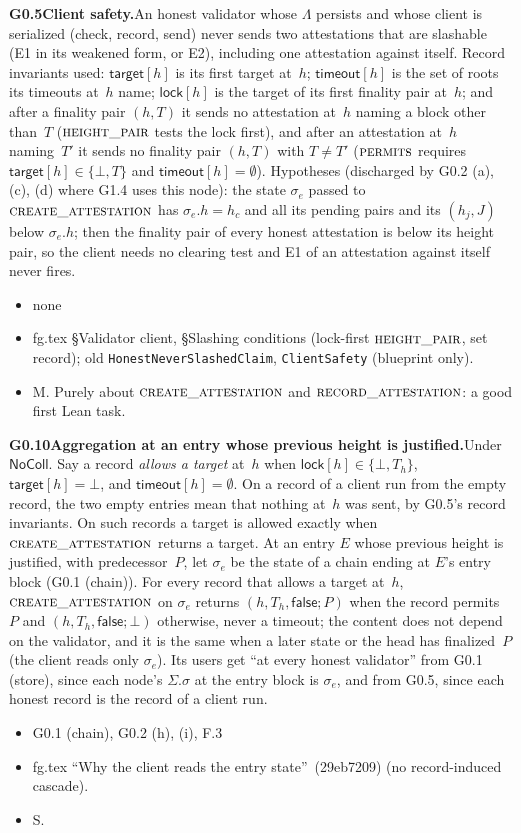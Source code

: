 \documentclass{article}
\newcommand{\fname}[1]{\text{\textsc{#1}}}
\newcommand{\dagnode}[6]{%
\par\medskip\noindent\textbf{#1\enspace #2.}\enspace #3
\begin{itemize}[leftmargin=2.2em,itemsep=0pt,topsep=2pt]
\item[\emph{Uses}] #4
\item[\emph{Evid.}] #5
\item[\emph{Task}] #6
\end{itemize}}
\begin{document}
\dagnode{G0.5}{Client safety}{An honest validator whose $\Lambda$ persists
and whose client is serialized (check, record, send) never sends two
attestations that are slashable (E1 in its weakened form, or E2), including
one attestation against itself.  Record invariants used: $\mathsf{target}[h]$
is its first target at~$h$; $\mathsf{timeout}[h]$ is the set of roots its
timeouts at~$h$ name; $\mathsf{lock}[h]$ is the target of its first finality
pair at~$h$; and after a finality pair $(h,T)$ it sends no attestation at~$h$ naming a
block other than~$T$ ($\fname{height\_pair}$ tests the lock first), and
after an attestation at~$h$ naming~$T'$ it sends no finality pair $(h,T)$ with
$T\neq T'$ ($\fname{permits}$ requires $\mathsf{target}[h]\in\{\bot,T\}$ and
$\mathsf{timeout}[h]=\emptyset$).  Hypotheses (discharged by G0.2 (a),
(c), (d) where G1.4 uses this node): the state $\sigma_e$ passed to
$\fname{create\_attestation}$ has $\sigma_e.h=h_c$ and all its pending pairs
and its $(h_j,J)$ below $\sigma_e.h$; then the finality pair of every honest
attestation is below its height pair, so the client needs no clearing test
and E1 of an attestation against itself never fires.}
{none}{fg.tex \S Validator client, \S Slashing conditions
(lock-first $\fname{height\_pair}$, set record); old
\texttt{HonestNeverSlashedClaim}, \texttt{ClientSafety} (blueprint only).}{M.  Purely about
$\fname{create\_attestation}$ and $\fname{record\_attestation}$: a good first
Lean task.}

\dagnode{G0.10}{Aggregation at an entry whose previous height is justified}{Under $\mathsf{NoColl}$.  Say
a record \emph{allows a target} at~$h$ when $\mathsf{lock}[h]\in\{\bot,T_h\}$,
$\mathsf{target}[h]=\bot$, and $\mathsf{timeout}[h]=\emptyset$.  On a record
of a client run from the empty record, the two empty entries mean that
nothing at~$h$ was sent, by G0.5's record invariants.  On such records a
target is allowed exactly when $\fname{create\_attestation}$ returns a
target.  At an entry $E$ whose previous height is justified, with
predecessor~$P$, let $\sigma_e$ be the state of a chain ending at $E$'s
entry block (G0.1 (chain)).  For every record that allows a target at~$h$,
$\fname{create\_attestation}$ on $\sigma_e$ returns $(h,T_h,\mathsf{false};P)$
when the record permits~$P$ and $(h,T_h,\mathsf{false};\bot)$ otherwise,
never a timeout; the content does not depend on the validator, and it is the
same when a later state or the head has finalized~$P$ (the client reads only
$\sigma_e$).  Its users get ``at every honest validator'' from G0.1 (store),
since each node's $\Sigma.\sigma$ at the entry block is $\sigma_e$, and from
G0.5, since each honest record is the record of a client run.}
{G0.1 (chain), G0.2 (h), (i), F.3}{fg.tex ``Why the client reads the entry state''~(29eb7209)
(no record-induced cascade).}{S.}
\end{document}
